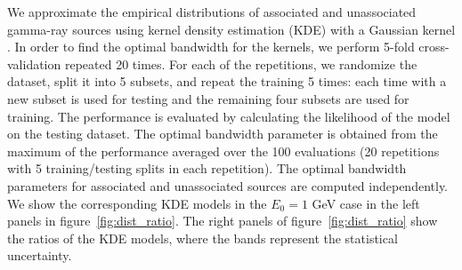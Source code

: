 \documentclass[12pt, a4paper]{article}
\newcommand{\aure}[1]{\textcolor{orange}{[AA: #1]}}
\newcommand{\dima}[1]{\textcolor{purple}{{Dima: #1}}}
\begin{document}
We approximate the empirical distributions of associated and unassociated gamma-ray sources using kernel density estimation (KDE) with a Gaussian kernel \cite{bishop}. 
%
In order to find the optimal bandwidth for the kernels, we perform 5-fold cross-validation repeated 20 times. 
For each of the repetitions, we randomize the dataset,  split it into 5 subsets, and repeat the training 5 times: each time with a new subset is used for testing and the remaining four subsets are used for training.
The performance is evaluated by calculating the likelihood of the model on the testing dataset.
The optimal bandwidth parameter is obtained from the maximum of the performance averaged over the 100 evaluations (20 repetitions with 5 training/testing splits in each repetition).
The optimal bandwidth parameters for associated and unassociated sources are computed independently.
We show the corresponding KDE models in the $E_0 = 1$ GeV case in the left panels in figure~\ref{fig:dist_ratio}.
The right panels of figure~\ref{fig:dist_ratio} show the ratios of the KDE models, where the bands represent the statistical uncertainty.
\end{document}

